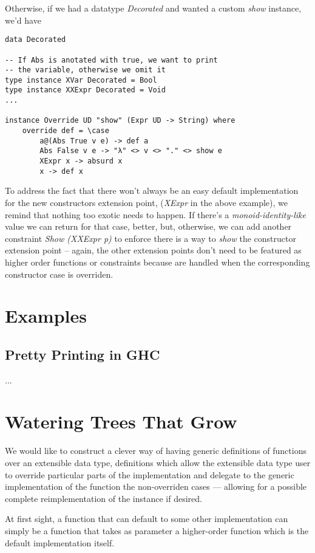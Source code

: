 \documentclass{article}
\begin{document}
Otherwise, if we had a datatype \emph{Decorated} and wanted a custom \emph{show}
instance, we'd have

\begin{lstlisting}
data Decorated

-- If Abs is anotated with true, we want to print
-- the variable, otherwise we omit it
type instance XVar Decorated = Bool
type instance XXExpr Decorated = Void
...

instance Override UD "show" (Expr UD -> String) where
    override def = \case
        a@(Abs True v e) -> def a
        Abs False v e -> "λ" <> v <> "." <> show e
        XExpr x -> absurd x
        x -> def x
\end{lstlisting}

To address the fact that there won't always be an easy default implementation
for the new constructors extension point, (\emph{XExpr} in the above example),
we remind that nothing too exotic needs to happen. If there's a
\emph{monoid-identity-like} value we can return for that case, better, but,
otherwise, we can add another constraint \emph{Show (XXExpr p)} to enforce there
is a way to \emph{show} the constructor extension point -- again, the other
extension points don't need to be featured as higher order functions or
constraints because are handled when the corresponding constructor case is
overriden.


\section{Examples}

\subsection{Pretty Printing in GHC}

...

\section{Watering Trees That Grow}

We would like to construct a clever way of having generic definitions of
functions over an extensible data type, definitions which allow the extensible
data type user to override particular parts of the implementation and delegate
to the generic implementation of the function the non-overriden cases ---
allowing for a possible complete reimplementation of the instance if desired.

At first sight, a function that can default to some other implementation can
simply be a function that takes as parameter a higher-order function which is
the default implementation itself.
\end{document}
